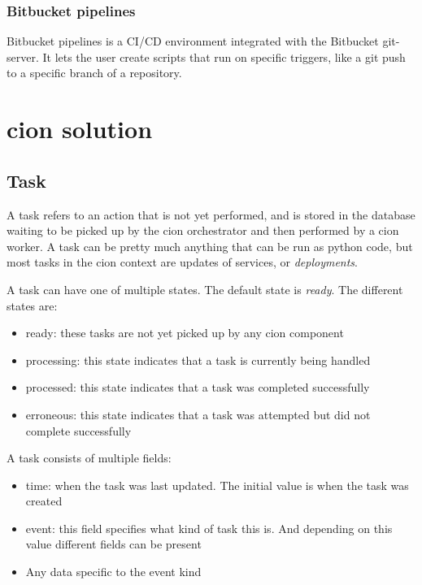 \subsubsection{Bitbucket pipelines}
Bitbucket pipelines is a CI/CD environment integrated with the Bitbucket git-server. It lets the user create scripts that run on specific triggers, like a git push to a specific branch of a repository.

\section{cion solution}


\subsection{Task}
A task refers to an action that is not yet performed, and is stored in the database waiting to be picked up by the cion orchestrator and then performed by a cion worker. A task can be pretty much anything that can be run as python code, but most tasks in the cion context are updates of services, or \textit{deployments}.

A task can have one of multiple states. The default state is \textit{ready}.
The different states are:
\begin{itemize}
    \item{} ready: these tasks are not yet picked up by any cion component
    \item{} processing: this state indicates that a task is currently being handled
    \item{} processed: this state indicates that a task was completed successfully
    \item{} erroneous: this state indicates that a task was attempted but did not complete successfully
\end{itemize}

A task consists of multiple fields:
\begin{itemize}
    \item{} time: when the task was last updated. The initial value is when the task was created
    \item{} event: this field specifies what kind of task this is. And depending on this value different fields can be present
    \item{} Any data specific to the event kind
\end{itemize}

